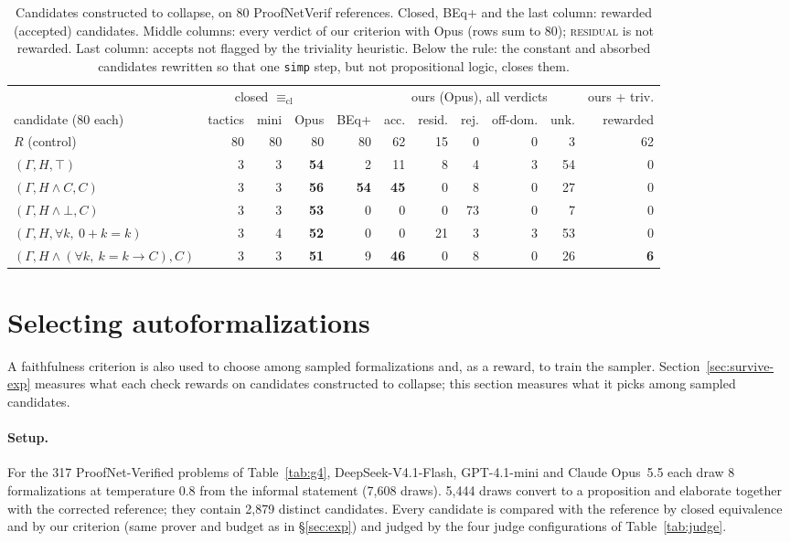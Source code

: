 \documentclass[10pt]{article}
\theoremstyle{definition}
\newcommand{\Ecl}{\mathrel{\equiv_{\mathrm{cl}}}}
\newcommand{\V}[1]{\textsc{#1}}
\begin{document}
\begin{table}[t]
\centering\small
\begin{tabular}{lrrrrrrrrrr}
\toprule
& \multicolumn{3}{c}{closed $\Ecl$} & & \multicolumn{5}{c}{ours (Opus), all verdicts} & ours + triv.\\
\cmidrule(lr){2-4}\cmidrule(lr){6-10}
candidate (80 each) & tactics & mini & Opus & BEq+ & acc. & resid. & rej. & off-dom. & unk. & rewarded\\
\midrule
$R$ (control) & 80 & 80 & 80 & 80 & 62 & 15 & 0 & 0 & 3 & 62\\
$(\Gamma,H,\top)$ & 3 & 3 & \textbf{54} & 2 & 11 & 8 & 4 & 3 & 54 & 0\\
$(\Gamma,H\wedge C,C)$ & 3 & 3 & \textbf{56} & \textbf{54} & \textbf{45} & 0 & 8 & 0 & 27 & 0\\
$(\Gamma,H\wedge\bot,C)$ & 3 & 3 & \textbf{53} & 0 & 0 & 0 & 73 & 0 & 7 & 0\\
\midrule
$(\Gamma,H,\forall k,\ 0+k=k)$ & 3 & 4 & \textbf{52} & 0 & 0 & 21 & 3 & 3 & 53 & 0\\
$(\Gamma,H\wedge(\forall k,\ k=k\to C),C)$ & 3 & 3 & \textbf{51} & 9 & \textbf{46} & 0 & 8 & 0 & 26 & \textbf{6}\\
\bottomrule
\end{tabular}
\caption{Candidates constructed to collapse, on 80 ProofNetVerif references. Closed, BEq+ and the
last column: rewarded (accepted) candidates. Middle columns: every verdict of our criterion with
Opus (rows sum to 80); \V{residual} is not rewarded. Last column: accepts not flagged by the
triviality heuristic. Below the
rule: the constant and absorbed candidates rewritten so that one \texttt{simp} step, but not
propositional logic, closes them.}
\label{tab:hack}
\end{table}

\section{Selecting autoformalizations}\label{sec:select}

A faithfulness criterion is also used to choose among sampled formalizations and, as a reward,
to train the sampler. Section~\ref{sec:survive-exp} measures what each check rewards on candidates
constructed to collapse; this section measures what it picks among sampled candidates.

\paragraph{Setup.} For the 317 ProofNet-Verified problems of Table~\ref{tab:g4}, DeepSeek-V4.1-Flash,
GPT-4.1-mini and Claude Opus~5.5 each draw 8 formalizations at temperature 0.8 from the informal
statement (7,608 draws). 5,444 draws convert to a proposition and elaborate together with the
corrected reference; they contain 2,879 distinct candidates. Every candidate is compared with
the reference by closed equivalence and by our criterion (same prover and budget as in
\S\ref{sec:exp}) and judged by the four judge configurations of Table~\ref{tab:judge}.
\end{document}
